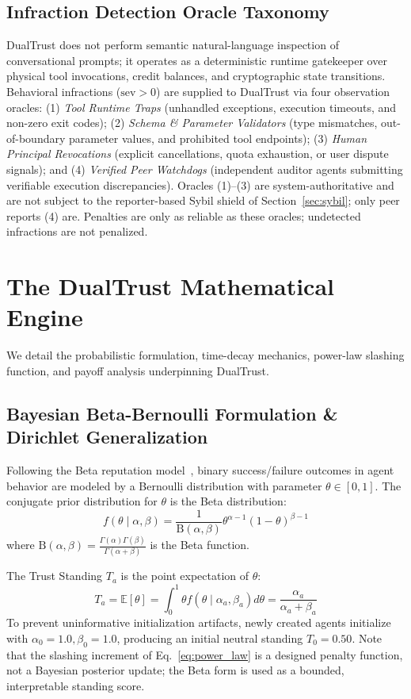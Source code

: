 \documentclass[journal]{IEEEtran}
\begin{document}
\subsection{Infraction Detection Oracle Taxonomy}
DualTrust does not perform semantic natural-language inspection of conversational prompts; it operates as a deterministic runtime gatekeeper over physical tool invocations, credit balances, and cryptographic state transitions. Behavioral infractions ($\text{sev} > 0$) are supplied to DualTrust via four observation oracles: (1) \emph{Tool Runtime Traps} (unhandled exceptions, execution timeouts, and non-zero exit codes); (2) \emph{Schema \& Parameter Validators} (type mismatches, out-of-boundary parameter values, and prohibited tool endpoints); (3) \emph{Human Principal Revocations} (explicit cancellations, quota exhaustion, or user dispute signals); and (4) \emph{Verified Peer Watchdogs} (independent auditor agents submitting verifiable execution discrepancies). Oracles (1)--(3) are system-authoritative and are not subject to the reporter-based Sybil shield of Section~\ref{sec:sybil}; only peer reports (4) are. Penalties are only as reliable as these oracles; undetected infractions are not penalized.

\section{The DualTrust Mathematical Engine}
\label{sec:math_engine}

We detail the probabilistic formulation, time-decay mechanics, power-law slashing function, and payoff analysis underpinning DualTrust.

\subsection{Bayesian Beta-Bernoulli Formulation \& Dirichlet Generalization}
Following the Beta reputation model~\cite{josang2002beta}, binary success/failure outcomes in agent behavior are modeled by a Bernoulli distribution with parameter $\theta \in [0, 1]$. The conjugate prior distribution for $\theta$ is the Beta distribution:
\begin{equation}
f(\theta \mid \alpha, \beta) = \frac{1}{\text{B}(\alpha, \beta)} \theta^{\alpha - 1} (1 - \theta)^{\beta - 1}
\end{equation}
where $\text{B}(\alpha, \beta) = \frac{\Gamma(\alpha)\Gamma(\beta)}{\Gamma(\alpha + \beta)}$ is the Beta function.

The Trust Standing $T_a$ is the point expectation of $\theta$:
\begin{equation}
T_a = \mathbb{E}[\theta] = \int_{0}^{1} \theta f(\theta \mid \alpha_a, \beta_a) d\theta = \frac{\alpha_a}{\alpha_a + \beta_a}
\label{eq:beta_expectation}
\end{equation}
To prevent uninformative initialization artifacts, newly created agents initialize with $\alpha_0 = 1.0, \beta_0 = 1.0$, producing an initial neutral standing $T_0 = 0.50$. Note that the slashing increment of Eq.~\eqref{eq:power_law} is a designed penalty function, not a Bayesian posterior update; the Beta form is used as a bounded, interpretable standing score.
\end{document}
